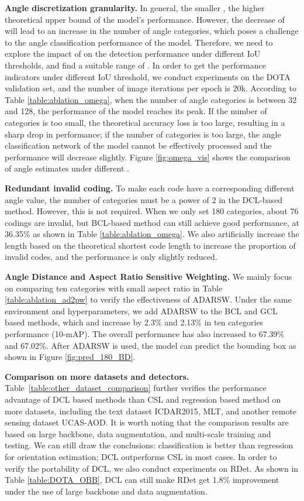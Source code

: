 \documentclass[final]{cvpr}
\begin{document}
\textbf{Angle discretization granularity.}
In general, the smaller , the higher theoretical upper bound of the model's performance. However, the decrease of  will lead to an increase in the number of angle categories, which poses a challenge to the angle classification performance of the model. Therefore, we need to explore the impact of  on the detection performance under different IoU thresholds, and find a suitable range of . In order to get the performance indicators under different IoU threshold, we conduct experiments on the DOTA validation set, and the number of image iterations per epoch is 20k. According to Table \ref{table:ablation_omega}, when the number of angle categories is between 32 and 128, the performance of the model reaches its peak. If the number of categories is too small, the theoretical accuracy loss is too large, resulting in a sharp drop in performance; if the number of categories is too large, the angle classification network of the model cannot be effectively processed and the performance will decrease slightly. Figure \ref{fig:omega_vis} shows the comparison of angle estimates under different .

\textbf{Redundant invalid coding.}
To make each code have a corresponding different angle value, the number of categories must be a power of 2 in the DCL-based method. However, this is not required. When we only set 180 categories, about 76 codings are invalid, but BCL-based method can still achieve good performance, at 36.35\% as shown in Table \ref{table:ablation_omega}. We also artificially increase the length based on the theoretical shortest code length to increase the proportion of invalid codes, and the performance is only slightly reduced.

\textbf{Angle Distance and Aspect Ratio Sensitive Weighting.} 
We mainly focus on comparing ten categories with small aspect ratio in Table \ref{table:ablation_ad2pw} to verify the effectiveness of ADARSW.
Under the same environment and hyperparameters, we add ADARSW to the BCL and GCL based methods, which and increase by 2.3\% and 2.13\% in ten categories performance (10-mAP). The overall performance has also increased to 67.39\% and 67.02\%. After ADARSW is used, the model can predict the bounding box as shown in Figure \ref{fig:pred_180_BD}.

\textbf{Comparison on more datasets and detectors.}
Table~\ref{table:other_dataset_comparison} further verifies the performance advantage of DCL based methods than CSL and regression based method on more datasets, including the text dataset ICDAR2015, MLT, and another remote sensing dataset UCAS-AOD. It is worth noting that the comparison results are based on large backbone, data augmentation, and multi-scale training and testing. We can still draw the conclusions: classification is better than regression for orientation estimation; DCL outperforms CSL in most cases. In order to verify the portability of DCL, we also conduct experiments on RDet. As shown in Table \ref{table:DOTA_OBB}, DCL can still make RDet get 1.8\% improvement under the use of large backbone and data augmentation.
\end{document}
